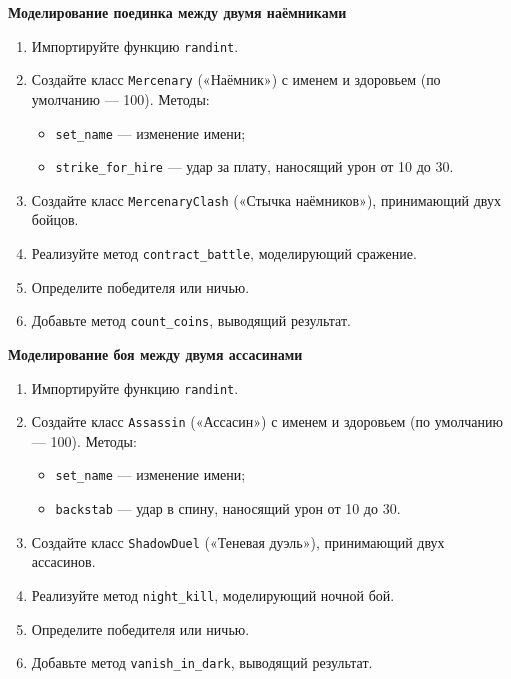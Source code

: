 \item \textbf{Моделирование поединка между двумя наёмниками}

\begin{enumerate}
    \item Импортируйте функцию \texttt{randint}.

    \item Создайте класс \texttt{Mercenary} («Наёмник») с именем и здоровьем (по умолчанию — 100).  
    Методы:
    \begin{itemize}
        \item \texttt{set\_name} — изменение имени;
        \item \texttt{strike\_for\_hire} — удар за плату, наносящий урон от 10 до 30.
    \end{itemize}

    \item Создайте класс \texttt{MercenaryClash} («Стычка наёмников»), принимающий двух бойцов.

    \item Реализуйте метод \texttt{contract\_battle}, моделирующий сражение.

    \item Определите победителя или ничью.

    \item Добавьте метод \texttt{count\_coins}, выводящий результат.
\end{enumerate}

\item \textbf{Моделирование боя между двумя ассасинами}

\begin{enumerate}
    \item Импортируйте функцию \texttt{randint}.

    \item Создайте класс \texttt{Assassin} («Ассасин») с именем и здоровьем (по умолчанию — 100).  
    Методы:
    \begin{itemize}
        \item \texttt{set\_name} — изменение имени;
        \item \texttt{backstab} — удар в спину, наносящий урон от 10 до 30.
    \end{itemize}

    \item Создайте класс \texttt{ShadowDuel} («Теневая дуэль»), принимающий двух ассасинов.

    \item Реализуйте метод \texttt{night\_kill}, моделирующий ночной бой.

    \item Определите победителя или ничью.

    \item Добавьте метод \texttt{vanish\_in\_dark}, выводящий результат.
\end{enumerate}

